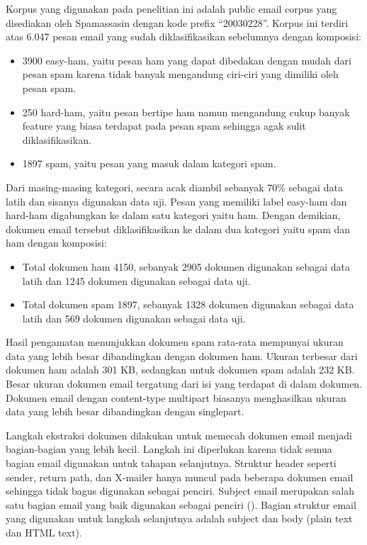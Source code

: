 Korpus yang digunakan pada penelitian ini adalah public email corpus yang disediakan oleh Spamassasin dengan kode prefix “20030228”. Korpus ini terdiri atas 6.047 pesan email yang sudah diklasifikasikan sebelumnya dengan komposisi:
\begin{itemize}
	\item 3900 easy-ham, yaitu pesan ham yang dapat dibedakan dengan mudah dari pesan spam karena tidak banyak mengandung ciri-ciri yang dimiliki oleh pesan spam.
	\item 250 hard-ham, yaitu pesan bertipe ham namun mengandung cukup banyak feature yang biasa terdapat pada pesan spam sehingga agak sulit diklasifikasikan.
	\item 1897 spam, yaitu pesan yang masuk dalam kategori spam.
\end{itemize}

Dari masing-masing kategori, secara acak diambil sebanyak 70\% sebagai data latih dan sisanya digunakan data uji. Pesan yang memiliki label easy-ham dan hard-ham digabungkan ke dalam satu kategori yaitu ham. Dengan demikian, dokumen email tersebut diklasifikasikan ke dalam dua kategori yaitu spam dan ham dengan komposisi:
\begin{itemize}
	\item Total dokumen ham 4150, sebanyak 2905 dokumen digunakan sebagai data latih dan 1245 dokumen digunakan sebagai data uji.
	\item Total dokumen spam 1897, sebanyak 1328 dokumen digunakan sebagai data latih dan 569 dokumen digunakan sebagai data uji.
\end{itemize}

Hasil pengamatan menunjukkan dokumen spam rata-rata mempunyai ukuran data yang lebih besar dibandingkan dengan dokumen ham. Ukuran terbesar dari dokumen ham adalah 301 KB, sedangkan untuk dokumen spam adalah 232 KB. Besar ukuran dokumen email tergatung dari isi yang terdapat di dalam dokumen. Dokumen email dengan content-type multipart biasanya menghasilkan ukuran data yang lebih besar dibandingkan dengan singlepart.

Langkah ekstraksi dokumen dilakukan untuk memecah dokumen email menjadi bagian-bagian yang lebih kecil. Langkah ini diperlukan karena tidak semua bagian email digunakan untuk tahapan selanjutnya. Struktur header seperti sender, return path, dan X-mailer hanya muncul pada beberapa dokumen email sehingga tidak bagus digunakan sebagai penciri. Subject email merupakan salah satu bagian email yang baik digunakan sebagai penciri (\cite{SAHAMI}). Bagian struktur email yang digunakan untuk langkah selanjutnya adalah subject dan body (plain text dan HTML text).

